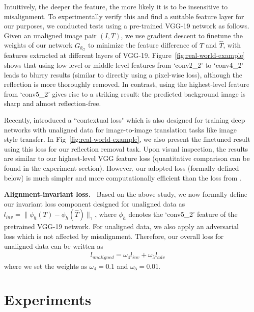 \documentclass[10pt,twocolumn,letterpaper]{article}
\begin{document}
Intuitively, the deeper the feature, the more likely it is to be insensitive to misalignment. To experimentally verify this and find a suitable feature layer for our purposes, we conducted tests using a pre-trained VGG-19 network as follows. Given an unaligned image pair $(I,T)$, we use gradient descent to finetune the weights of our network $G_{\theta_G}$ to minimize the feature difference of $T$ and $\hat{T}$, with features extracted at different layers of VGG-19. Figure~\ref{fig:real-world-example} shows that using low-level or middle-level features from `conv2\_2' to `conv4\_2' leads to blurry results (similar to directly using a pixel-wise loss), although the reflection is more thoroughly removed. In contrast, using the highest-level feature from `conv5\_2' gives rise to a striking result: the predicted background image is sharp and almost reflection-free.

Recently, \cite{Mechrez_2018_ECCV} introduced a ``contextual loss" which is also designed for training deep networks with unaligned data for image-to-image translation tasks like image style transfer. In Fig~\ref{fig:real-world-example}, we also present the finetuned result using this loss for our reflection removal task. Upon visual inspection, the results are similar to our highest-level VGG feature loss (quantitative comparison can be found in the experiment section). However, our adopted loss (formally defined below) is much simpler and more computationally efficient than the loss from \cite{Mechrez_2018_ECCV}.

\vspace{6pt}
\noindent\textbf{Alignment-invariant loss.~}
Based on the above study, we now formally define our invariant loss component designed for unaligned data as $l_{inv} = \| \phi_h (T) - \phi_h (\hat{T}) \|_1$, where $\phi_h$ denotes the `conv5\_2' feature of the pretrained VGG-19 network.  For unaligned data, we also apply an adversarial loss which is not affected by misalignment. Therefore, our overall loss for unaligned data can be written as
\begin{align}
l_{unaligned} = \omega_4 l_{inv}  + \omega_5 l_{adv}
\label{eq:zz}
\end{align}
where we set the weights as $\omega_4 = 0.1$ and $\omega_5 = 0.01$.





\section{Experiments}\label{sec:experiments}
\end{document}
